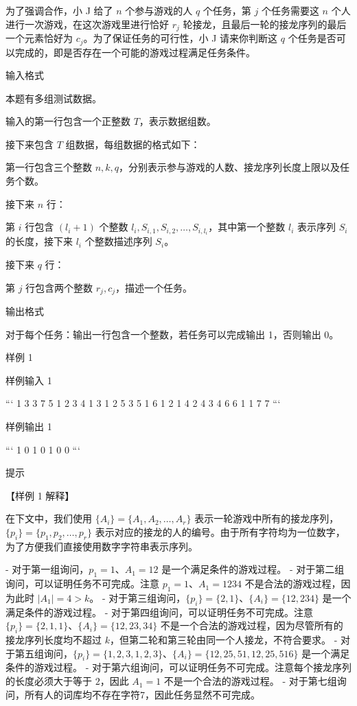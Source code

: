 \documentclass[12pt,twiside,a4paper]{ctexbook}
\numberwithin{chapter}{part}
\begin{document}
为了强调合作，小 J 给了 $n$ 个参与游戏的人 $q$ 个任务，第 $j$ 个任务需要这 $n$ 个人进行一次游戏，在这次游戏里进行恰好 $r_j$ 轮接龙，且最后一轮的接龙序列的最后一个元素恰好为 $c_j$。为了保证任务的可行性，小 J 请来你判断这 $q$ 个任务是否可以完成的，即是否存在一个可能的游戏过程满足任务条件。

 输入格式

本题有多组测试数据。

输入的第一行包含一个正整数 $T$，表示数据组数。

接下来包含 $T$ 组数据，每组数据的格式如下：

第一行包含三个整数 $n, k, q$，分别表示参与游戏的人数、接龙序列长度上限以及任务个数。

接下来 $n$ 行：

第 $i$ 行包含 $(l_i + 1)$ 个整数 $l_i, S_{i,1}, S_{i,2}, \dots , S_{i,l_i}$，其中第一个整数 $l_i$ 表示序列 $S_i$ 的长度，接下来 $l_i$ 个整数描述序列 $S_i$。

接下来 $q$ 行：

第 $j$ 行包含两个整数 $r_j, c_j$，描述一个任务。

 输出格式

对于每个任务：输出一行包含一个整数，若任务可以完成输出 1，否则输出 0。

 样例 1

 样例输入 1

```
1
3 3 7
5 1 2 3 4 1
3 1 2 5
3 5 1 6
1 2
1 4
2 4
3 4
6 6
1 1
7 7
```

 样例输出 1

```
1
0
1
0
1
0
0
```

 提示

【样例 1 解释】

在下文中，我们使用 $\{A_i\} = \{A_1, A_2, \dots , A_r\}$ 表示一轮游戏中所有的接龙序列，$\{p_i\} = \{p_1, p_2, \dots , p_r\}$ 表示对应的接龙的人的编号。由于所有字符均为一位数字，为了方便我们直接使用数字字符串表示序列。

- 对于第一组询问，$p_1 = 1$、$A_1 = 12$ 是一个满足条件的游戏过程。
- 对于第二组询问，可以证明任务不可完成。注意 $p_1 = 1$、$A_1 = 1234$ 不是合法的游戏过程，因为此时 $|A_1| = 4 > k$。
- 对于第三组询问，$\{p_i\} = \{2, 1\}$、$\{A_i\} = \{12, 234\}$ 是一个满足条件的游戏过程。
- 对于第四组询问，可以证明任务不可完成。注意 $\{p_i\} = \{2, 1, 1\}、\{A_i\} = \{12, 23, 34\}$ 不是一个合法的游戏过程，因为尽管所有的接龙序列长度均不超过 $k$，但第二轮和第三轮由同一个人接龙，不符合要求。
- 对于第五组询问，$\{p_i\} = \{1, 2, 3, 1, 2, 3\}$、$\{A_i\} = \{12, 25, 51, 12, 25, 516\}$ 是一个满足条件的游戏过程。
-  对于第六组询问，可以证明任务不可完成。注意每个接龙序列的长度必须大于等于 $2$，因此 $A_1 = 1$ 不是一个合法的游戏过程。
- 对于第七组询问，所有人的词库均不存在字符7，因此任务显然不可完成。
\end{document}
